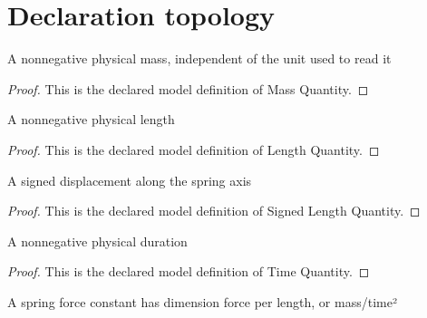 \section{Declaration topology}
\begin{definition}
  \label{def:physics:phyx-mini-0268:phyxminiproblems-problemphyxmini0268-massquantity}
  A nonnegative physical mass, independent of the unit used to read it
\end{definition}
\begin{proof}
  This is the declared model definition of Mass Quantity.
\end{proof}
\begin{definition}
  \label{def:physics:phyx-mini-0268:phyxminiproblems-problemphyxmini0268-lengthquantity}
  A nonnegative physical length
\end{definition}
\begin{proof}
  This is the declared model definition of Length Quantity.
\end{proof}
\begin{definition}
  \label{def:physics:phyx-mini-0268:phyxminiproblems-problemphyxmini0268-signedlengthquantity}
  A signed displacement along the spring axis
\end{definition}
\begin{proof}
  This is the declared model definition of Signed Length Quantity.
\end{proof}
\begin{definition}
  \label{def:physics:phyx-mini-0268:phyxminiproblems-problemphyxmini0268-timequantity}
  A nonnegative physical duration
\end{definition}
\begin{proof}
  This is the declared model definition of Time Quantity.
\end{proof}
\begin{definition}
  \label{def:physics:phyx-mini-0268:phyxminiproblems-problemphyxmini0268-springconstantquantity}
  A spring force constant has dimension force per length, or mass/time²
\end{definition}
